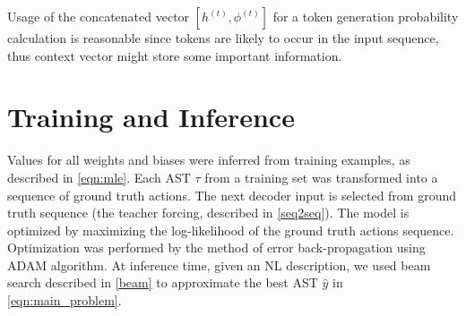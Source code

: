 Usage of the concatenated vector $[h^{(t)}, \phi^{(t)}]$ for a token generation probability calculation is reasonable since tokens are likely to occur in the input sequence, thus context vector might store some important information.

\section{Training and Inference}

Values for all weights and biases were inferred from training examples, as described in \cref{eqn:mle}. Each AST $\tau$ from a training set was transformed into a sequence of ground truth actions. The next decoder input is selected from ground truth sequence (the teacher forcing, described in  \cref{seq2seq}). The model is optimized by maximizing the log-likelihood of the ground truth actions sequence. Optimization was performed by the method of error back-propagation using ADAM \parencite{Kingma2014} algorithm. At inference time, given an NL description, we used beam search described in \cref{beam} to approximate the best AST $\hat{y}$ in \cref{eqn:main_problem}.




